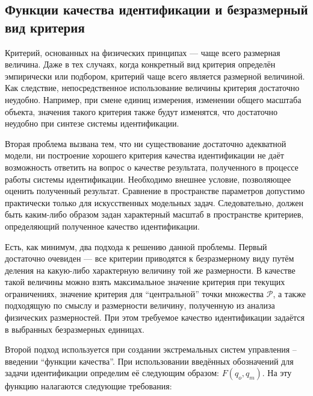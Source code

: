 

\subsection{Функции качества идентификации и безразмерный вид критерия}  %


Критерий, основанных на физических принципах --- чаще всего размерная
величина. Даже в тех случаях, когда конкретный вид критерия определён эмпирически
или подбором, критерий чаще всего является размерной величиной.
Как следствие, непосредственное использование величины критерия
достаточно неудобно. Например, при смене единиц измерения,
изменении общего масштаба объекта, значения такого критерия также будут
изменятся, что достаточно неудобно при синтезе системы идентификации.

Вторая проблема вызвана тем, что ни существование достаточно
адекватной модели, ни построение хорошего критерия качества идентификации
не даёт возможность ответить на вопрос о качестве результата,
полученного в процессе работы системы идентификации.
Необходимо внешнее условие, позволяющее оценить полученный результат.
Сравнение в пространстве параметров допустимо практически только для
искусственных модельных задач. Следовательно,
должен быть каким-либо образом задан характерный масштаб
в пространстве критериев, определяющий полученное качество
идентификации.

Есть, как минимум, два подхода к решению данной проблемы.
Первый достаточно очевиден --- все критерии приводятся к безразмерному виду путём деления
на какую-либо характерную величину той же размерности. В качестве такой величины
можно взять максимальное значение критерия при текущих ограничениях,
значение критерия для ``центральной'' точки множества $\mathcal{P}$,
а также подходящую по смыслу и размерности величину, полученную
из анализа физических размерностей.
При этом требуемое качество идентификации задаётся в
выбранных безразмерных единицах.

Второй подход используется при создании экстремальных систем управления
-- введении ``функции качества''.
При использовании введённых обозначений для задачи идентификации
определим её следующим образом:
\label{atu:d:F}$F(q_o, q_m)$.
На эту функцию налагаются следующие требования:

